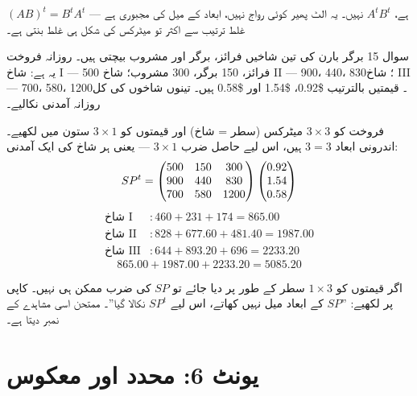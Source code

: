\begin{ghalti}
\((AB)^{t}=B^{t}A^{t}\) ہے، \(A^{t}B^{t}\) نہیں۔ یہ الٹ پھیر کوئی رواج نہیں،
ابعاد کے میل کی مجبوری ہے --- غلط ترتیب سے اکثر تو میٹرکس کی شکل ہی غلط بنتی ہے۔
\end{ghalti}

\begin{sawal}{سوال \textenglish{15}}
برگر بارن کی تین شاخیں فرائز، برگر اور مشروب بیچتی ہیں۔ روزانہ فروخت یہ ہے:
شاخ \textenglish{I} --- \textenglish{500} فرائز، \textenglish{150} برگر،
\textenglish{300} مشروب؛ شاخ \textenglish{II} --- \textenglish{900}،
\textenglish{440}، \textenglish{830}؛ شاخ \textenglish{III} ---
\textenglish{700}، \textenglish{580}، \textenglish{1200}۔ قیمتیں بالترتیب
\textenglish{\$0.92}، \textenglish{\$1.54} اور \textenglish{\$0.58} ہیں۔ تینوں
شاخوں کی کل روزانہ آمدنی نکالیے۔
\end{sawal}

\begin{hal}
فروخت کو \(3\times3\) میٹرکس (سطر = شاخ) اور قیمتوں کو \(3\times1\) ستون میں
لکھیے۔ اندرونی ابعاد \(3=3\) ہیں، اس لیے حاصل ضرب \(3\times1\) --- یعنی ہر شاخ
کی ایک آمدنی:
\[
SP^{t}=\begin{pmatrix}500&150&300\\900&440&830\\700&580&1200\end{pmatrix}\begin{pmatrix}0.92\\1.54\\0.58\end{pmatrix}
\]
\[
\begin{aligned}
\text{شاخ I}  &: 460+231+174=865.00\\
\text{شاخ II} &: 828+677.60+481.40=1987.00\\
\text{شاخ III}&: 644+893.20+696=2233.20
\end{aligned}
\]
\[
865.00+1987.00+2233.20=5085.20
\]

\end{hal}

\begin{ghalti}
اگر قیمتوں کو \(1\times3\) سطر کے طور پر دیا جائے تو \(SP\) کی ضرب ممکن ہی نہیں۔
کاپی پر لکھیے: ''\(SP\) کے ابعاد میل نہیں کھاتے، اس لیے \(SP^{t}\) نکالا گیا''۔
ممتحن اسی مشاہدے کے نمبر دیتا ہے۔
\end{ghalti}

\section*{یونٹ \textenglish{6}: محدد اور معکوس}

